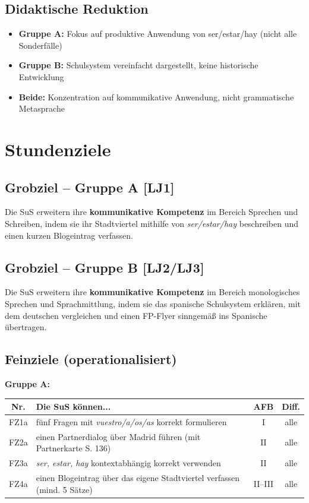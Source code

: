 \documentclass[11pt,a4paper]{article}
\begin{document}
\subsection{Didaktische Reduktion}

\begin{itemize}
    \item \textbf{Gruppe A:} Fokus auf produktive Anwendung von ser/estar/hay (nicht alle Sonderfälle)
    \item \textbf{Gruppe B:} Schulsystem vereinfacht dargestellt, keine historische Entwicklung
    \item \textbf{Beide:} Konzentration auf kommunikative Anwendung, nicht grammatische Metasprache
\end{itemize}

\section{Stundenziele}

\subsection{Grobziel -- Gruppe A [LJ1]}
Die SuS erweitern ihre \textbf{kommunikative Kompetenz} im Bereich Sprechen und Schreiben, indem sie ihr Stadtviertel mithilfe von \textit{ser/estar/hay} beschreiben und einen kurzen Blogeintrag verfassen.

\subsection{Grobziel -- Gruppe B [LJ2/LJ3]}
Die SuS erweitern ihre \textbf{kommunikative Kompetenz} im Bereich monologisches Sprechen und Sprachmittlung, indem sie das spanische Schulsystem erklären, mit dem deutschen vergleichen und einen FP-Flyer sinngemäß ins Spanische übertragen.

\subsection{Feinziele (operationalisiert)}

\textbf{Gruppe A:}

\begin{tabular}{|c|p{7cm}|c|c|}
\hline
\textbf{Nr.} & \textbf{Die SuS können...} & \textbf{AFB} & \textbf{Diff.} \\
\hline
FZ1a & fünf Fragen mit \textit{vuestro/a/os/as} korrekt formulieren & I & alle \\
\hline
FZ2a & einen Partnerdialog über Madrid führen (mit Partnerkarte S. 136) & II & alle \\
\hline
FZ3a & \textit{ser, estar, hay} kontextabhängig korrekt verwenden & II & alle \\
\hline
FZ4a & einen Blogeintrag über das eigene Stadtviertel verfassen (mind. 5 Sätze) & II--III & alle \\
\hline
\end{tabular}
\end{document}
